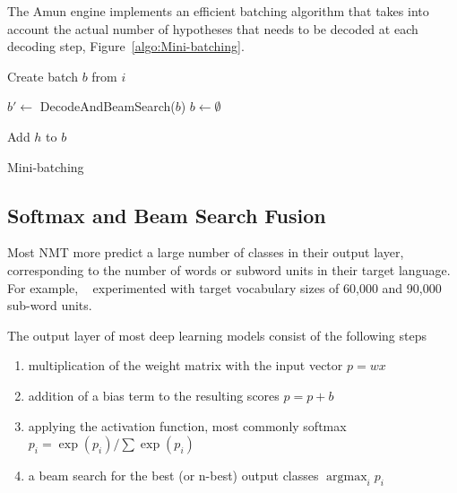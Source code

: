 \documentclass[11pt,a4paper]{article}
\DeclareMathOperator*{\argmax}{argmax}
\begin{document}
The Amun engine implements an efficient batching algorithm that takes into account the actual number of hypotheses that needs to be decoded at each decoding step, Figure~\ref{algo:Mini-batching}.

\begin{algorithm}
\begin{algorithmic}

\State Create batch $b$ from $i$

  \State $b' \gets$ DecodeAndBeamSearch($b$)
  \State $b \gets \emptyset$
  
      \State Add $h$ to $b$
    \EndIf
  \EndFor
\EndWhile

\EndProcedure

\end{algorithmic}
\caption{Mini-batching}
\label{algo:Mini-batching}
\end{algorithm}


\subsection{Softmax and Beam Search Fusion}

Most NMT more predict a large number of classes in their output layer, corresponding to the number of words or subword units in their target language. For example, ~\citet{sennrich-haddow-birch:2016:P16-12} experimented with target vocabulary sizes of 60,000 and 90,000 sub-word units.

The output layer of most deep learning models consist of the following steps
\begin{enumerate}
   \item \vspace{-2 mm} multiplication of the weight matrix with the input vector $p = w x$
   \item \vspace{-2 mm} addition of a bias term to the resulting scores $p = p + b$
   \item \vspace{-2 mm} applying the activation function, most commonly softmax $ p_i = \exp(p_i) / \sum \exp(p_i) $
   \item \vspace{-2 mm} a beam search for the best (or n-best) output classes $\argmax_i p_i$
\end{enumerate}
\end{document}
